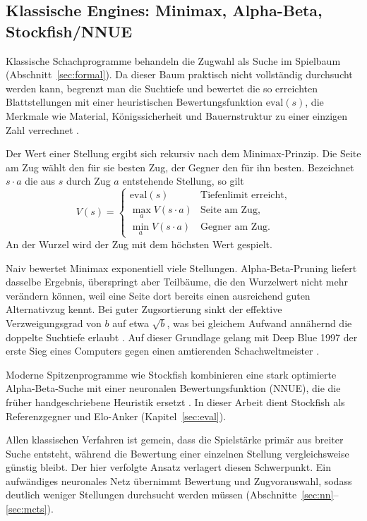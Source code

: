 \documentclass[
  a4paper, 12pt,
  parskip=half,
  headings=small,
  bibliography=totoc
]{scrartcl}
\begin{document}
\subsection{Klassische Engines: Minimax, Alpha-Beta, Stockfish/NNUE} %
\label{sec:minimax}
Klassische Schachprogramme behandeln die Zugwahl als Suche im Spielbaum
(Abschnitt~\ref{sec:formal}). Da dieser Baum praktisch nicht vollständig durchsucht werden
kann, begrenzt man die Suchtiefe und bewertet die so erreichten Blattstellungen
mit einer heuristischen Bewertungsfunktion \(\mathrm{eval}(s)\), die Merkmale
wie Material, Königssicherheit und Bauernstruktur zu einer einzigen Zahl
verrechnet \parencite{shannon1950}.

Der Wert einer Stellung ergibt sich rekursiv nach dem Minimax-Prinzip. Die Seite
am Zug wählt den für sie besten Zug, der Gegner den für ihn besten. Bezeichnet
\(s\cdot a\) die aus \(s\) durch Zug \(a\) entstehende Stellung, so gilt
\[
  V(s) =
  \begin{cases}
    \mathrm{eval}(s)          & \text{Tiefenlimit erreicht,}\\
    \max_{a} V(s\cdot a)      & \text{Seite am Zug,}\\
    \min_{a} V(s\cdot a)      & \text{Gegner am Zug.}
  \end{cases}
\]
An der Wurzel wird der Zug mit dem höchsten Wert gespielt.

Naiv bewertet Minimax exponentiell viele Stellungen. Alpha-Beta-Pruning liefert
dasselbe Ergebnis, überspringt aber Teilbäume, die den Wurzelwert nicht mehr
verändern können, weil eine Seite dort bereits einen ausreichend guten
Alternativzug kennt. Bei guter Zugsortierung sinkt der effektive
Verzweigungsgrad von \(b\) auf etwa \(\sqrt{b}\), was bei gleichem Aufwand annähernd
die doppelte Suchtiefe erlaubt \parencite{knuth1975}. Auf dieser Grundlage
gelang mit Deep Blue 1997 der erste Sieg eines Computers gegen einen
amtierenden Schachweltmeister \parencite{campbell2002}.

Moderne Spitzenprogramme wie Stockfish kombinieren eine stark optimierte
Alpha-Beta-Suche mit einer neuronalen Bewertungsfunktion (NNUE), die die früher
handgeschriebene Heuristik ersetzt \parencite{klein2022neural}. In dieser Arbeit
dient Stockfish als Referenzgegner und Elo-Anker (Kapitel~\ref{sec:eval}).

Allen klassischen Verfahren ist gemein, dass die Spielstärke primär aus breiter
Suche entsteht, während die Bewertung einer einzelnen Stellung vergleichsweise
günstig bleibt. Der hier verfolgte Ansatz verlagert diesen Schwerpunkt. Ein
aufwändiges neuronales Netz übernimmt Bewertung und Zugvorauswahl, sodass
deutlich weniger Stellungen durchsucht werden müssen
(Abschnitte~\ref{sec:nn}--\ref{sec:mcts}).
\end{document}
